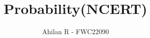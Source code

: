 \documentclass[journal,12pt,twocolumn]{IEEEtran}
\begin{document}
\makeatletter
{}
\makeatother

\let\StandardTheFigure\thefigure
\let\vec\mathbf
\let\j\jmath
\renewcommand{\thefigure}{\theproblem}




\title{Probability(NCERT)}
\author{Ahilan R - FWC22090
	}

\maketitle



\renewcommand{\thefigure}{\theenumi}
\renewcommand{\thetable}{\theenumi}
\renewcommand{\theequation}{\theenumi}
\end{document}
